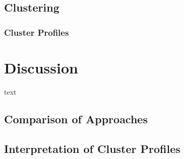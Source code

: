 \documentclass[11pt, a4paper]{article}
\begin{document}
\subsection{Clustering}













\subsubsection{Cluster Profiles}










\pagebreak 
\section{Discussion}




text 







\subsection{Comparison of Approaches}


















\subsection{Interpretation of Cluster Profiles}
\end{document}

